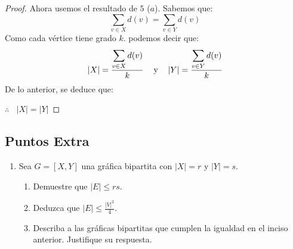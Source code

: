 \documentclass{article}
\begin{document}
\begin{enumerate}
\begin{enumerate}
\begin{proof}
      Ahora usemos el resultado de $5$ ($a$). Sabemos que:
      \[
      \sum_{v \in X} d(v) = \sum_{v \in Y} d(v)
      \]
      Como cada vértice tiene grado $k$. podemos decir que:
      \[
      \abs{X} = \frac{\displaystyle \sum_{v \in X} d(v)}{k} \text{\hspace{0.3cm}
        y \hspace{0.3cm}} \abs{Y} = \frac{\displaystyle \sum_{v \in Y} d(v)}{k}
      \]
      De lo anterior, se deduce que:

      \hspace*{5.6cm} $\therefore\ \ \ \ |X| = |Y|$
    \end{proof}
  \end{enumerate}
  
\end{enumerate}

\subsection*{Puntos Extra}

\begin{enumerate}
\item Sea $G = [X, Y]$ una gr\'afica bipartita con $|X| = r$ y $|Y| = s$.
  \begin{enumerate}
  \item Demuestre que $|E| \le rs$.

  \item Deduzca que $|E| \le \frac{|V|^2}{4}$.

  \item Describa a las gr\'aficas bipartitas que cumplen la igualdad en el
    inciso anterior. Justifique su respuesta.
  \end{enumerate}

\end{enumerate}
\end{document}
